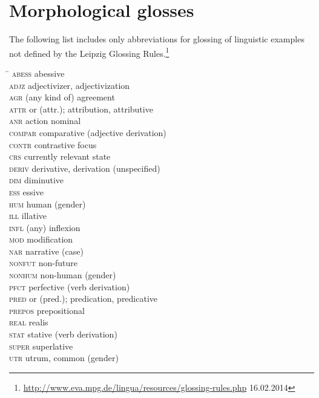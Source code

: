 

\section*{Morphological glosses}

The following list includes only abbreviations for glossing of linguistic examples not defined by the Leipzig Glossing Rules.\footnote{\url{http://www.eva.mpg.de/lingua/resources/glossing-rules.php} 16.02.2014}

\newcommand{\TABh}{\hspace{50pt}}%

\begin{tabbing}
\TABh \= \kill
\textsc{abess} \> abessive\\
\textsc{adjz} \> adjectivizer, adjectivization\\
\textsc{agr} \> (any kind of) agreement\\
\textsc{attr} \> or (attr.); attribution, attributive\\%
\textsc{anr} \> action nominal\\
\textsc{compar} \> comparative (adjective derivation)\\
\textsc{contr} \> contrastive focus\\
\textsc{crs} \> currently relevant state\\
\textsc{deriv} \> derivative, derivation (unspecified)\\
\textsc{dim} \> diminutive\\
\textsc{ess} \> essive\\
\textsc{hum} \> human (gender)\\
\textsc{ill} \> illative\\
\textsc{infl} \> (any) inflexion\\
\textsc{mod} \> modification\\
\textsc{nar} \> narrative (case)\\
\textsc{nonfut} \> non-future\\
\textsc{nonhum} \> non-human (gender)\\
\textsc{pfct} \> perfective (verb derivation)\\
\textsc{pred} \> or (pred.); predication, predicative\\%
\textsc{prepos} \> prepositional\\
\textsc{real} \> realis\\
\textsc{stat} \> stative (verb derivation)\\
\textsc{super} \> superlative\\
\textsc{utr} \> utrum, common (gender)\\
\end{tabbing}

